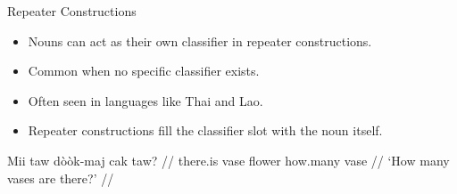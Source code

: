 \documentclass{beamer}
\begin{document}

\begin{frame}{Repeater Constructions}
\begin{itemize}
    \item Nouns can act as their own classifier in repeater constructions.
    \item Common when no specific classifier exists.
    \item Often seen in languages like Thai and Lao.
    \item Repeater constructions fill the classifier slot with the noun itself.
\end{itemize}
\ex
\begingl
\gla Mii taw dòòk-maj cak taw? //
\glb there.is vase flower how.many vase //
\glft ‘How many vases are there?’ //
\endgl
\xe
\end{frame}

\end{document}
